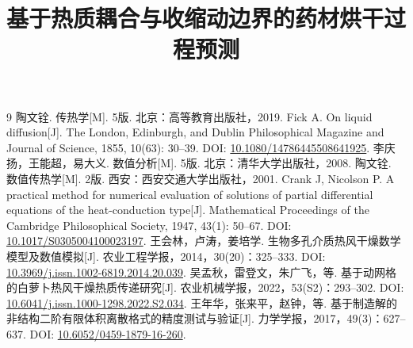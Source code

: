 \documentclass[withoutpreface,bwprint]{cumcmthesis}
\title{基于热质耦合与收缩动边界的药材烘干过程预测}
\begin{document}
\maketitle


\begin{thebibliography}{9}
 陶文铨. 传热学[M]. 5版. 北京：高等教育出版社，2019.
 Fick A. On liquid diffusion[J]. The London, Edinburgh, and Dublin Philosophical Magazine and Journal of Science, 1855, 10(63): 30--39. DOI: \href{https://doi.org/10.1080/14786445508641925}{10.1080/14786445508641925}.
 李庆扬，王能超，易大义. 数值分析[M]. 5版. 北京：清华大学出版社，2008.
 陶文铨. 数值传热学[M]. 2版. 西安：西安交通大学出版社，2001.
 Crank J, Nicolson P. A practical method for numerical evaluation of solutions of partial differential equations of the heat-conduction type[J]. Mathematical Proceedings of the Cambridge Philosophical Society, 1947, 43(1): 50--67. DOI: \href{https://doi.org/10.1017/S0305004100023197}{10.1017/S0305004100023197}.
 王会林，卢涛，姜培学. 生物多孔介质热风干燥数学模型及数值模拟[J]. 农业工程学报，2014，30(20)：325--333. DOI: \href{https://doi.org/10.3969/j.issn.1002-6819.2014.20.039}{10.3969/j.issn.1002-6819.2014.20.039}.
 吴孟秋，雷登文，朱广飞，等. 基于动网格的白萝卜热风干燥热质传递研究[J]. 农业机械学报，2022，53(S2)：293--302. DOI: \href{https://doi.org/10.6041/j.issn.1000-1298.2022.S2.034}{10.6041/j.issn.1000-1298.2022.S2.034}.
 王年华，张来平，赵钟，等. 基于制造解的非结构二阶有限体积离散格式的精度测试与验证[J]. 力学学报，2017，49(3)：627--637. DOI: \href{https://doi.org/10.6052/0459-1879-16-260}{10.6052/0459-1879-16-260}.
\end{thebibliography}
\label{maintextend}

\end{document}
